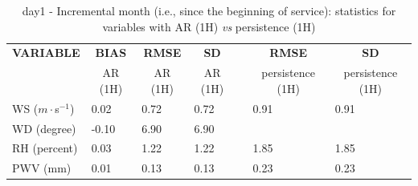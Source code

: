 \begin{table}[]
\begin{center}
\begin{tabular}{|l|l|l|l|l|l|l|}
\hline
\multicolumn{1}{|c|}{\cellcolor[HTML]{C0C0C0}\textbf{VARIABLE}} & \multicolumn{1}{c|}{\cellcolor[HTML]{C0C0C0}\textbf{BIAS}} & \multicolumn{1}{c|}{\cellcolor[HTML]{C0C0C0}\textbf{RMSE}} & \multicolumn{1}{c|}{\cellcolor[HTML]{C0C0C0}\textbf{SD}} & & \multicolumn{1}{c|}{\cellcolor[HTML]{C0C0C0}\textbf{RMSE}} & \multicolumn{1}{c|}{\cellcolor[HTML]{C0C0C0}\textbf{SD}}\\
\multicolumn{1}{|c|}{\cellcolor[HTML]{C0C0C0}} & \multicolumn{1}{c|}{\cellcolor[HTML]{C0C0C0}AR (1H)} & \multicolumn{1}{c|}{\cellcolor[HTML]{C0C0C0}AR (1H)} & \multicolumn{1}{c|}{\cellcolor[HTML]{C0C0C0}AR (1H)} & & \multicolumn{1}{c|}{\cellcolor[HTML]{C0C0C0} persistence (1H)} & \multicolumn{1}{c|}{\cellcolor[HTML]{C0C0C0}persistence (1H)}\\\hline
\cellcolor[HTML]{C0C0C0}WS ($m\cdot$s$^{-1}$) &      0.02  &      0.72  &      0.72  & &      0.91  &      0.91\\
\cellcolor[HTML]{C0C0C0}WD (degree)           &     -0.10  &      6.90  &      6.90  & &   & \\
\cellcolor[HTML]{C0C0C0}RH (percent)          &      0.03  &      1.22  &      1.22  & &      1.85  &      1.85\\
\cellcolor[HTML]{C0C0C0}PWV (mm)              &      0.01 &      0.13 &      0.13 & &      0.23 &      0.23\\
\hline
\end{tabular}
\caption{day1 - Incremental month (i.e., since the beginning of service): statistics for variables with AR (1H) \textit{vs} persistence (1H)}\label{tab:day1:statAFT:IM}
\end{center}
\end{table}

